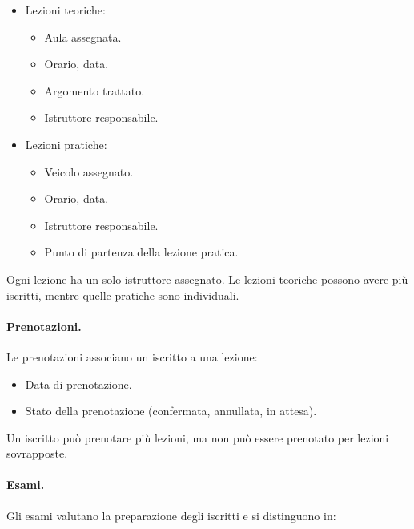 \documentclass[10pt,twoside]{article}
\begin{document}
{    \begin{itemize}
        \item Lezioni teoriche:
        \begin{itemize}
            \item Aula assegnata.
            \item Orario, data.
            \item Argomento trattato.
            \item Istruttore responsabile.
        \end{itemize}
        \item Lezioni pratiche:
        \begin{itemize}
            \item Veicolo assegnato.
            \item Orario, data.
            \item Istruttore responsabile.
            \item Punto di partenza della lezione pratica.
        \end{itemize}
    \end{itemize}

    Ogni lezione ha un solo istruttore assegnato. Le lezioni teoriche possono avere più iscritti, mentre quelle pratiche sono individuali.
    

    \paragraph{Prenotazioni.}
    Le prenotazioni associano un iscritto a una lezione:

    \begin{itemize}
        \item Data di prenotazione.
        \item Stato della prenotazione (confermata, annullata, in attesa).
    \end{itemize}

    Un iscritto può prenotare più lezioni, ma non può essere prenotato per lezioni sovrapposte.
    

    \paragraph{Esami.}
    Gli esami valutano la preparazione degli iscritti e si distinguono in:

}
\end{document}
